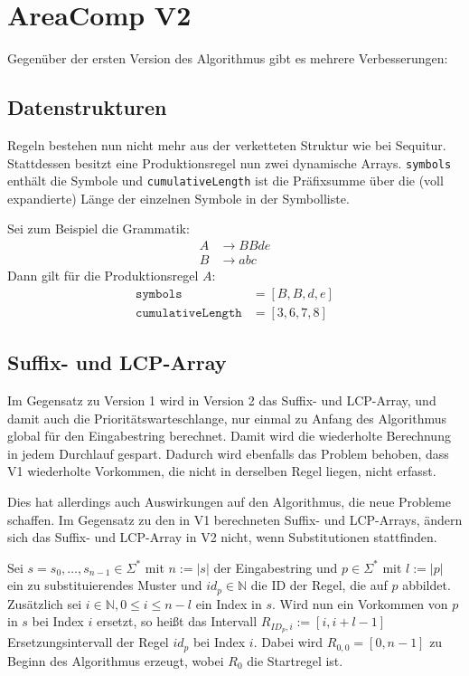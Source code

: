 \section{AreaComp V2}


Gegenüber der ersten Version des Algorithmus gibt es mehrere Verbesserungen:

\subsection{Datenstrukturen} Regeln bestehen nun nicht mehr aus der verketteten Struktur wie bei Sequitur. Stattdessen besitzt eine Produktionsregel nun zwei dynamische Arrays. \texttt{symbols} enthält die Symbole und \texttt{cumulativeLength} ist die Präfixsumme über die (voll expandierte) Länge der einzelnen Symbole in der Symbolliste.

Sei zum Beispiel die Grammatik: 
\begin{align*}
	A &\rightarrow BBde\\
	B &\rightarrow abc
\end{align*}
Dann gilt für die Produktionsregel $A$: 
\begin{align*}
	\texttt{symbols} &= [B, B, d, e]\\
	\texttt{cumulativeLength} &= [3, 6, 7, 8]
\end{align*}

\subsection{Suffix- und LCP-Array}
Im Gegensatz zu Version 1 wird in Version 2 das Suffix- und LCP-Array, und damit auch die Prioritätswarteschlange, nur einmal zu Anfang des Algorithmus global für den Eingabestring berechnet. Damit wird die wiederholte Berechnung in jedem Durchlauf gespart. 
Dadurch wird ebenfalls das Problem behoben, dass V1 wiederholte Vorkommen, die nicht in derselben Regel liegen, nicht erfasst.

Dies hat allerdings auch Auswirkungen auf den Algorithmus, die neue Probleme schaffen. Im Gegensatz zu den in V1 berechneten Suffix- und LCP-Arrays, ändern sich das Suffix- und LCP-Array in V2 nicht, wenn Substitutionen stattfinden. 

Sei $s = s_0, \dots, s_{n-1} \in \Sigma^*$ mit $n := |s|$ der Eingabestring und $p \in \Sigma^*$ mit $l := |p|$  ein zu substituierendes Muster und $id_p \in \mathbb{N}$ die ID der Regel, die auf $p$ abbildet. Zusätzlich sei $i \in \mathbb{N}, 0 \leq i \leq n - l$ ein Index in $s$. Wird nun ein Vorkommen von $p$ in $s$ bei Index $i$ ersetzt, so heißt das Intervall $R_{ID_p, i} := [i, i + l - 1]$ Ersetzungsintervall der Regel $id_p$ bei Index $i$. Dabei wird $R_{0, 0} = [0, n-1]$ zu Beginn des Algorithmus erzeugt, wobei $R_0$ die Startregel ist. \\

